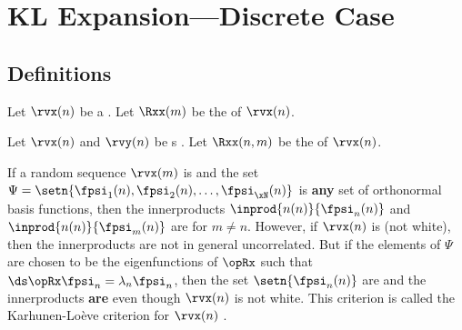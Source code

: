 
\chapter{KL Expansion---Discrete Case}
\section{Definitions}
\label{sec:KL}
\begin{definition}
\label{def:white_seq}
Let $\rvx(n)$ be a    .
Let $\Rxx(m)$ be the   of $\rvx(n)$.
\end{definition}

\begin{definition}
\label{def:opRnm}
Let $\rvx(n)$ and $\rvy(n)$ be s .
Let $\Rxx(n,m)$ be the   of $\rvx(n)$.
\end{definition}

If a random sequence $\rvx(m)$ is  
and the set $\Psi=\setn{\fpsi_1(n),\fpsi_2(n),\ldots,\fpsi_\xN(n)}$
is \textbf{any} set of orthonormal basis functions, then the innerproducts
$\inprod{n(n)}{\fpsi_n(n)}$ and $\inprod{n(n)}{\fpsi_m(n)}$ are 
for $m\ne  n$.
However, if $\rvx(n)$ is  (not white), then the innerproducts are not
in general uncorrelated.
But if the elements of $\Psi$ are chosen to be the eigenfunctions of $\opRx$ such
that $\ds\opRx \fpsi_n = \lambda_n \fpsi_n$,
then the set $\setn{\fpsi_n(n)}$ are   and
the innerproducts \textbf{are}  even though $\rvx(n)$ is not white.
This criterion is called the  Karhunen-Lo\`{e}ve criterion for $\rvx(n)$ .

